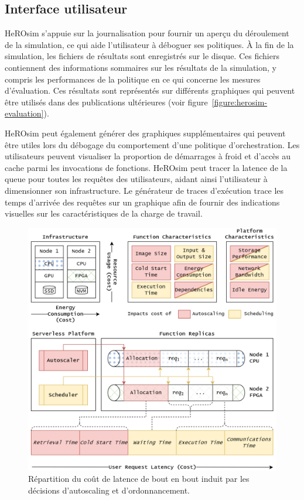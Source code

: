 \subsection{Interface utilisateur}

HeROsim s'appuie sur la journalisation pour fournir un aperçu du déroulement de la simulation, ce qui aide l'utilisateur à déboguer ses politiques. À la fin de la simulation, les fichiers de résultats sont enregistrés sur le disque. Ces fichiers contiennent des informations sommaires sur les résultats de la simulation, y compris les performances de la politique en ce qui concerne les mesures d'évaluation. Ces résultats sont représentés sur différents graphiques qui peuvent être utilisés dans des publications ultérieures (voir figure~\ref{figure:herosim-evaluation}).

HeROsim peut également générer des graphiques supplémentaires qui peuvent être utiles lors du débogage du comportement d'une politique d'orchestration. Les utilisateurs peuvent visualiser la proportion de démarrages à froid et d'accès au cache parmi les invocations de fonctions. HeROsim peut tracer la latence de la queue pour toutes les requêtes des utilisateurs, aidant ainsi l'utilisateur à dimensionner son infrastructure. Le générateur de traces d'exécution trace les temps d'arrivée des requêtes sur un graphique afin de fournir des indications visuelles sur les caractéristiques de la charge de travail.

\begin{figure}[t]
    \centering
    \includegraphics[width=\columnwidth]{7_Chapitre5/figures/serverless-cost.png}
    \caption{Répartition du coût de latence de bout en bout induit par les décisions d'autoscaling et d'ordonnancement.}
\label{figure:herosim-cost}
\end{figure}

